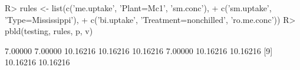 \begin{Schunk}
% --begin: "pbld_custom"
\begin{Sinput}
R> rules <- list(c('me.uptake', 'Plant=Mc1', 'sm.conc'),
+                c('sm.uptake', 'Type=Mississippi'),
+                c('bi.uptake', 'Treatment=nonchilled', 'ro.me.conc'))
R> pbld(testing, rules, p, v)
\end{Sinput}
\begin{Soutput}
 [1]  7.00000  7.00000 10.16216 10.16216 10.16216  7.00000 10.16216 10.16216
 [9] 10.16216 10.16216
\end{Soutput}
%
% --end: "pbld_custom"
\end{Schunk}
